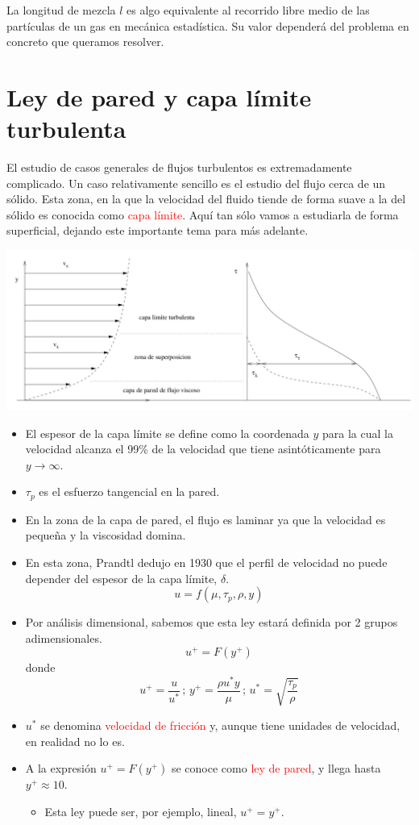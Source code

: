 	La longitud de mezcla $l$ es algo equivalente al recorrido libre
	medio de las partículas de un gas en mecánica estadística. Su valor
	dependerá del problema en concreto que queramos resolver.

\section{Ley de pared y capa límite turbulenta}

	
	El estudio de casos generales de flujos turbulentos es extremadamente
	complicado. Un caso relativamente sencillo es el estudio del flujo
	cerca de un sólido. Esta zona, en la que la velocidad del fluido tiende
	de forma suave a la del sólido es conocida como \textcolor{red}{capa
		límite}. Aquí tan sólo vamos a estudiarla de forma superficial, dejando
	este importante tema para más adelante.
	
\begin{center}
	\includegraphics[width=0.7\linewidth]{TeX_files/chapter07-Turbulencia/pared}
\end{center}

	
	\begin{itemize}
		\item El espesor de la capa límite se define como la coordenada $y$ para
		la cual la velocidad alcanza el 99\% de la velocidad que tiene asintóticamente
		para $y\rightarrow\infty$. 
		\item $\tau_{p}$ es el esfuerzo tangencial en la pared.
		\item En la zona de la capa de pared, el flujo es laminar ya que la velocidad
		es pequeña y la viscosidad domina. 
		\item En esta zona, Prandtl dedujo en 1930 que el perfil de velocidad no
		puede depender del espesor de la capa límite, $\delta$. 
		\[
		u=f(\mu,\tau_{p},\rho,y)
		\]

		\item Por análisis dimensional, sabemos que esta ley estará definida por
		2 grupos adimensionales. 
		\[
		u^{+}=F(y^{+})
		\]
		donde 
		\[
		u^{+}=\frac{u}{u^{*}}\,;\,y^{+}=\frac{\rho u^{*}y}{\mu}\,;\,u^{*}=\sqrt{\frac{\tau_{p}}{\rho}}
		\]
		\item $u^{*}$ se denomina \textcolor{red}{velocidad de fricción} y, aunque
		tiene unidades de velocidad, en realidad no lo es.
		\item A la expresión $u^{+}=F(y^{+})$ se conoce como \textcolor{red}{ley
			de pared}, y llega hasta $y^{+}\approx10$. 
		
		\begin{itemize}
			\item Esta ley puede ser, por ejemplo, lineal, $u^{+}=y^{+}$.
		\end{itemize}
	\end{itemize}

